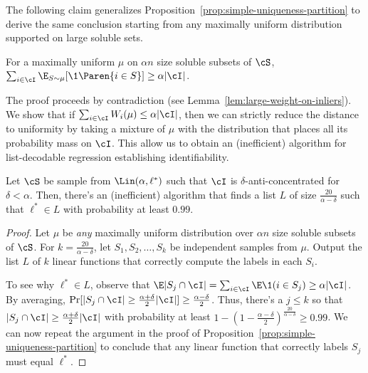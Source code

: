 
 
The following claim generalizes Proposition~\ref{prop:simple-uniqueness-partition} to derive the same conclusion starting from any maximally uniform distribution supported on large soluble sets.

\begin{proposition} \label{prop:fair-weight}
For a maximally uniform $\mu$ on $\alpha n$ size soluble subsets of $\cS$, $\sum_{i \in \cI} \E_{S \sim \mu} [\1 \Paren{i \in S}] \geq \alpha |\cI|$. 
\end{proposition}
The proof proceeds by contradiction (see Lemma~\ref{lem:large-weight-on-inliers}). We show that if $\sum_{i \in \cI} W_i(\mu) \leq \alpha |\cI|$, then we can strictly reduce the distance to uniformity by taking a mixture of $\mu$ with the distribution that places all its probability mass on $\cI$. This allow us to obtain an (inefficient) algorithm for list-decodable regression establishing identifiability. 
\begin{proposition} \label{prop:identifiability}
Let $\cS$ be sample from $\Lin(\alpha,\ell^*)$ such that $\cI$ is $\delta$-anti-concentrated for $\delta < \alpha$. Then, there's an (inefficient) algorithm that finds a list $L$ of size $\frac{20}{\alpha-\delta}$ such that $\ell^* \in L$ with probability at least $0.99$.
\end{proposition}
\begin{proof}
Let $\mu$ be \emph{any} maximally uniform distribution over $\alpha n$ size soluble subsets of $\cS$. 
For $k = \frac{20}{\alpha-\delta}$, let $S_1, S_2, \ldots, S_k$ be independent samples from $\mu$.
Output the list $L$ of $k$ linear functions that correctly compute the labels in each $S_i$.

To see why $\ell^* \in L$, observe that $\E |S_j \cap \cI|= \sum_{i \in \cI} \E \1(i \in S_j) \geq \alpha |\cI|$. 
By averaging, $\Pr [|S_j \cap \cI| \geq \frac{\alpha+\delta}{2} |\cI|] \geq \frac{\alpha-\delta}{2}$. Thus, there's  a $j \leq k$ so that $|S_j \cap \cI| \geq \frac{\alpha+\delta}{2} |\cI|$ with probability at least $1-(1-\frac{\alpha-\delta}{2})^{\frac{20}{\alpha-\delta}} \geq 0.99$. We can now repeat the argument in the proof of Proposition~\ref{prop:simple-uniqueness-partition} to conclude that any linear function that correctly labels $S_j$ must equal $\ell^*$.
\end{proof}


